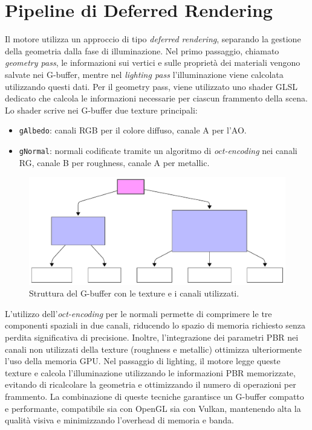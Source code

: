 \documentclass[12pt,a4paper,openright,twoside]{book}
\begin{document}
\section{Pipeline di Deferred Rendering}
Il motore utilizza un approccio di tipo \emph{deferred rendering}, separando la gestione della geometria dalla fase
di illuminazione. Nel primo passaggio, chiamato \emph{geometry pass}, le informazioni sui vertici e sulle proprietà dei
materiali vengono salvate nei G-buffer, mentre nel \emph{lighting pass} l'illuminazione viene calcolata utilizzando
questi dati.
Per il geometry pass, viene utilizzato uno shader GLSL dedicato che calcola le informazioni necessarie per ciascun
frammento della scena. Lo shader scrive nei G-buffer due texture principali:
\begin{itemize}
    \item \texttt{gAlbedo}: canali RGB per il colore diffuso, canale A per l'AO.
    \item \texttt{gNormal}: normali codificate tramite un algoritmo di \emph{oct-encoding} nei canali RG, canale B per roughness, canale A per metallic.
\end{itemize}
\begin{figure}[H!]
    \centering
    \includegraphics[width=.8\linewidth]{figures/g_buffer_textures.pdf}
    \caption{Struttura del G-buffer con le texture e i canali utilizzati.}
    \label{fig:g-buffer-textures}
\end{figure}
L'utilizzo dell'\emph{oct-encoding} per le normali permette di comprimere le tre componenti spaziali in due canali,
riducendo lo spazio di memoria richiesto senza perdita significativa di precisione. Inoltre, l'integrazione dei parametri
PBR nei canali non utilizzati della texture (roughness e metallic) ottimizza ulteriormente l'uso della memoria GPU.
Nel passaggio di lighting, il motore legge queste texture e calcola l'illuminazione utilizzando le informazioni PBR
memorizzate, evitando di ricalcolare la geometria e ottimizzando il numero di operazioni per frammento.
La combinazione di queste tecniche garantisce un G-buffer compatto e performante, compatibile sia con OpenGL sia
con Vulkan, mantenendo alta la qualità visiva e minimizzando l'overhead di memoria e banda.
\end{document}
